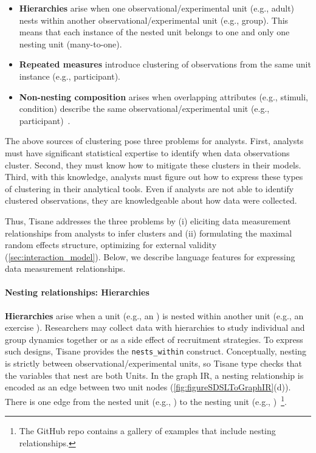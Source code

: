 \begin{itemize}
  \item \textbf{Hierarchies} arise when one observational/experimental unit
  (e.g., adult) nests within another observational/experimental unit (e.g.,
  group). This means that each instance of the nested unit belongs to one and
  only one nesting unit (many-to-one).
  \item \textbf{Repeated measures} introduce clustering of observations from the
  same unit instance (e.g., participant).
  \item \textbf{Non-nesting composition} arises when overlapping attributes
  (e.g., stimuli, condition) describe the same observational/experimental unit
  (e.g., participant)~\cite{gelmanHill2006regression}.
\end{itemize}

The above sources of clustering pose three problems for analysts. First,
analysts must have significant statistical expertise to identify when data
observations cluster. Second, they must know how to mitigate these clusters in
their models. Third, with this knowledge, analysts must figure out how to
express these types of clustering in their analytical tools. Even if analysts
are not able to identify clustered observations, they are knowledgeable about
how data were collected.

\enlargethispage{-12pt}

Thus, Tisane addresses the three problems by (i) eliciting data measurement
relationships from analysts to infer clusters and (ii) formulating the maximal
random effects structure, optimizing for external validity
(\ref{sec:interaction_model}). Below, we describe language features for expressing data measurement relationships.

\paragraph{Nesting relationships: Hierarchies}
\textbf{Hierarchies} arise when a unit (e.g., an \adult) is nested within another
unit (e.g., an exercise \group). Researchers may collect data with
hierarchies to study individual and group dynamics together or as a side effect of
recruitment strategies. To express such designs, Tisane provides the
\texttt{nests\_within} construct. Conceptually, nesting is strictly between
observational/experimental units, so Tisane type checks that the variables
that nest are both Units. %
In the graph IR, a nesting relationship is encoded as an edge between two unit
nodes (\ref{fig:figureSDSLToGraphIR}(d)). There is one edge from the nested
unit (e.g., \adult) to the nesting unit (e.g., \group)~\footnote{The GitHub repo contains a gallery of examples that include nesting relationships.}.

